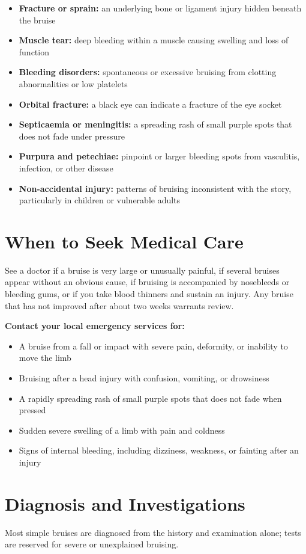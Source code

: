 \begin{itemize}
    \item \textbf{Fracture or sprain:} an underlying bone or ligament injury hidden beneath the bruise
    \item \textbf{Muscle tear:} deep bleeding within a muscle causing swelling and loss of function
    \item \textbf{Bleeding disorders:} spontaneous or excessive bruising from clotting abnormalities or low platelets
    \item \textbf{Orbital fracture:} a black eye can indicate a fracture of the eye socket
    \item \textbf{Septicaemia or meningitis:} a spreading rash of small purple spots that does not fade under pressure
    \item \textbf{Purpura and petechiae:} pinpoint or larger bleeding spots from vasculitis, infection, or other disease
    \item \textbf{Non-accidental injury:} patterns of bruising inconsistent with the story, particularly in children or vulnerable adults
\end{itemize}

\section*{When to Seek Medical Care}
See a doctor if a bruise is very large or unusually painful, if several bruises appear without an obvious cause, if bruising is accompanied by nosebleeds or bleeding gums, or if you take blood thinners and sustain an injury. Any bruise that has not improved after about two weeks warrants review.

\textbf{Contact your local emergency services for:}
\begin{itemize}
    \item A bruise from a fall or impact with severe pain, deformity, or inability to move the limb
    \item Bruising after a head injury with confusion, vomiting, or drowsiness
    \item A rapidly spreading rash of small purple spots that does not fade when pressed
    \item Sudden severe swelling of a limb with pain and coldness
    \item Signs of internal bleeding, including dizziness, weakness, or fainting after an injury
\end{itemize}

\section*{Diagnosis and Investigations}
Most simple bruises are diagnosed from the history and examination alone; tests are reserved for severe or unexplained bruising.

